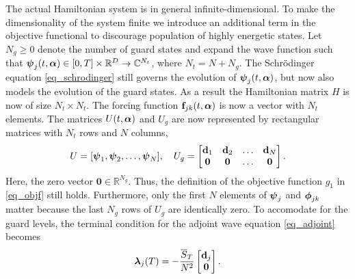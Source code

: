 \documentclass[11pt]{article}
\begin{document}
The actual Hamiltonian system is in general infinite-dimensional. To make the dimensionality of the system
finite we introduce an additional term in the objective functional to discourage population of
highly energetic states. Let $N_g\geq 0$ denote the number of guard states and expand the wave
function such that $\boldsymbol{\psi}_j(t,\boldsymbol{\alpha})\in [0, T]\times \mathbb{R}^D \to \mathbb{C}^{N_t}$, where
$N_{t} = N + N_g$. The Schr\"odinger equation \eqref{eq_schrodinger} still governs the evolution of
$\boldsymbol{\psi}_j(t,\boldsymbol{\alpha})$, but now also models the evolution of the guard states. As a result the
Hamiltonian matrix $H$ is now of size $N_t\times N_t$. The forcing function ${\mathbf f}_{jk}(t,\boldsymbol{\alpha})$
is now a vector with $N_t$ elements. The matrices $U(t,\boldsymbol{\alpha})$ and $U_g$ are now represented by
rectangular matrices with $N_t$ rows and $N$
columns,
\[
U = [ \boldsymbol{\psi}_1, \boldsymbol{\psi}_2, \ldots, \boldsymbol{\psi}_N ],\quad 
U_g = \begin{bmatrix}
{\mathbf d}_1 & {\mathbf d}_2 & \ldots & {\mathbf d}_N \\
\boldsymbol{0} & \boldsymbol{0} & \ldots & \boldsymbol{0}
  \end{bmatrix}.
\]
Here, the zero vector $\boldsymbol{0} \in \mathbb{R}^{N_g}$. Thus, the definition of the objective
function $g_1$ in \eqref{eq_objf} still holds. Furthermore, only the first $N$ elements of $\boldsymbol{\psi}_j$
and $\boldsymbol{\phi}_{jk}$ matter because the last $N_g$ rows of $U_g$ are identically zero. To accomodate for
the guard levels, the terminal condition for the adjoint wave equation \eqref{eq_adjoint} becomes
\begin{equation}\label{eq_adjoint-tc}
\boldsymbol{\lambda}_j(T) = -\frac{\overline{S}_T}{N^2} \begin{bmatrix}
  {\mathbf d}_j \\
  \boldsymbol{0}
  \end{bmatrix}.
\end{equation}
\end{document}
